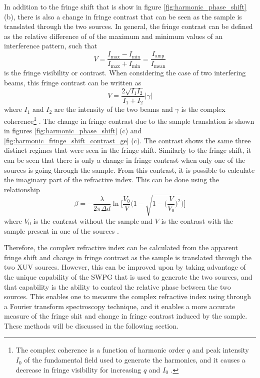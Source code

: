 In addition to the fringe shift that is show in figure \ref{fig:harmonic_phase_shift} (b), there is also a change in fringe contrast that can be seen as the sample is translated through the two sources.  In general, the fringe contrast can be defined as the relative difference of of the maximum and minimum values of an interference pattern, such that
\begin{equation}
	V=\frac{I_{\mathrm{max}} - I_{\mathrm{min}}}{I_{\mathrm{max}} + I_{\mathrm{min}}} = \frac{I_{\mathrm{amp}}}{I_{\mathrm{mean}}}
\end{equation}
is the fringe visibility or contrast.  When considering the case of two interfering beams, this fringe contrast can be written as
\begin{equation}
\label{eqn:fringe_visibility} 
	V = \frac{2\sqrt{I_1 I_2}}{I_1 + I_2}\rvert\gamma\lvert
\end{equation}
where $I_1$ and $I_2$ are the intensity of the two beams and $\gamma$ is the complex coherence\footnote{The complex coherence is a function of harmonic order $q$ and peak intensity $I_0$ of the fundamental field used to generate the harmonics, and it causes a decrease in fringe visibility for increasing $q$ and $I_0$ \cite{ditmireSpatialCoherenceMeasurement1996}.} \cite{hemmersMulticolorXUVInterferometry2009, ditmireSpatialCoherenceMeasurement1996, wilsonDoubleSlitInterferometry2012}.   
The change in fringe contrast due to the sample translation is shown in figures \ref{fig:harmonic_phase_shift} (c) and \ref{fig:harmonic_fringe_shift_contrast_ge} (c).  The contrast shows the same three distinct regimes that were seen in the fringe shift.  Similarly to the fringe shift, it can be seen that there is only a change in fringe contrast when only one of the sources is going through the sample.  From this contrast, it is possible to calculate the imaginary part of the refractive index.  This can be done using the relationship
\begin{equation}
\label{eqn:beta_fringe_contrast}
	\beta = -\frac{\lambda}{2\pi \Delta d} \ln\Bigg[\frac{V_0}{V}\Bigg(1-\sqrt{1-\bigg(\frac{V}{V_0}\bigg)^2}\Bigg)\Bigg]
\end{equation} 
where $V_0$ is the contrast without the sample and $V$ is the contrast with the sample present in one of the sources \cite{hemmersMulticolorXUVInterferometry2009}.

Therefore, the complex refractive index can be calculated from the apparent fringe shift and change in fringe contrast as the sample is translated through the two XUV sources.  However, this can be improved upon by taking advantage of the unique capability of the SWPG that is used to generate the two sources, and that capability is the ability to control the relative phase between the two sources.  This enables one to measure the complex refractive index using through a Fourier transform spectroscopy technique, and it enables a more accurate measure of the fringe shit and change in fringe contrast induced by the sample.  These methods will be discussed in the following section.

